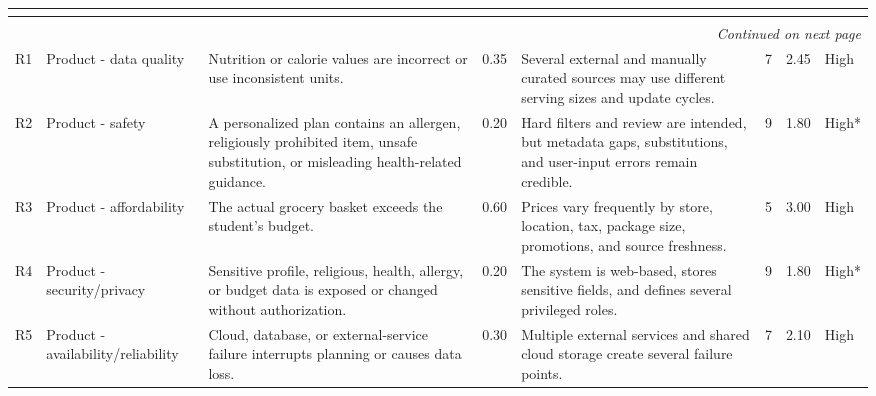 \documentclass[11pt,a4paper]{article}
\renewcommand{\arraystretch}{1.15}
\begin{document}
\begin{landscape}
\begin{center}
\scriptsize
\setlength{\tabcolsep}{2.5pt}
\renewcommand{\arraystretch}{1.18}
\begin{longtable}{|p{0.8cm}|p{3.2cm}|p{5.1cm}|p{1.4cm}|p{8.0cm}|p{1.6cm}|p{1.3cm}|p{1.8cm}|}
\hline
\rowcolor{headerblue} \textbf{\color{white}{ID}} & \textbf{\color{white}{Type}} & \textbf{\color{white}{Risk event}} & \textbf{\color{white}{Likelihood}} & \textbf{\color{white}{Likelihood rationale}} & \textbf{\color{white}{Severity (1, 3, 5, 7, 9)}} & \textbf{\color{white}{RE}} & \textbf{\color{white}{Priority}} \\ \hline
\endfirsthead
\hline
\rowcolor{headerblue} \textbf{\color{white}{ID}} & \textbf{\color{white}{Type}} & \textbf{\color{white}{Risk event}} & \textbf{\color{white}{Likelihood}} & \textbf{\color{white}{Likelihood rationale}} & \textbf{\color{white}{Severity (1, 3, 5, 7, 9)}} & \textbf{\color{white}{RE}} & \textbf{\color{white}{Priority}} \\ \hline
\endhead
\hline
\multicolumn{8}{r}{\small\itshape Continued on next page}\\
\endfoot
\hline
\endlastfoot
R1 & Product - data quality & Nutrition or calorie values are incorrect or use inconsistent units. & 0.35 & Several external and manually curated sources may use different serving sizes and update cycles. & 7 & 2.45 & High \\ \hline
R2 & Product - safety & A personalized plan contains an allergen, religiously prohibited item, unsafe substitution, or misleading health-related guidance. & 0.20 & Hard filters and review are intended, but metadata gaps, substitutions, and user-input errors remain credible. & 9 & 1.80 & High* \\ \hline
R3 & Product - affordability & The actual grocery basket exceeds the student's budget. & 0.60 & Prices vary frequently by store, location, tax, package size, promotions, and source freshness. & 5 & 3.00 & High \\ \hline
R4 & Product - security/privacy & Sensitive profile, religious, health, allergy, or budget data is exposed or changed without authorization. & 0.20 & The system is web-based, stores sensitive fields, and defines several privileged roles. & 9 & 1.80 & High* \\ \hline
R5 & Product - availability/reliability & Cloud, database, or external-service failure interrupts planning or causes data loss. & 0.30 & Multiple external services and shared cloud storage create several failure points. & 7 & 2.10 & High \\ \hline

\end{longtable}
\end{center}
\end{landscape}
\end{document}
